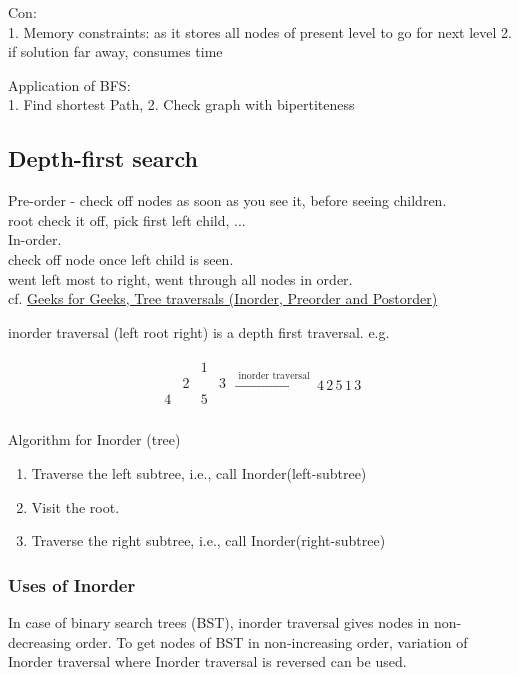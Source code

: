 \documentclass[10pt]{amsart}
\begin{document}
\begin{multicols*}{2}
Con: \\
1. Memory constraints: as it stores all nodes of present level to go for next level
2. if solution far away, consumes time

Application of BFS: \\
1. Find shortest Path,
2. Check graph with bipertiteness

\subsection{Depth-first search}

Pre-order - check off nodes as soon as you see it, before seeing children. \\
root check it off, pick first left child, ... \\

In-order. \\
check off node once left child is seen. \\
went left most to right, went through all nodes in order. \\

cf. \href{https://www.geeksforgeeks.org/tree-traversals-inorder-preorder-and-postorder/}{Geeks for Geeks, Tree traversals (Inorder, Preorder and Postorder)}

inorder traversal (left root right) is a depth first traversal. e.g.

\[
\begin{gathered}
\begin{matrix}
	& & 1 & \\
	& 2 & & 3 \\
	4 & & 5 & \\
\end{matrix} \xrightarrow{ \text{ inorder traversal } } 4 \, 2 \, 5 \, 1 \, 3
\end{gathered}
\]

Algorithm for Inorder (tree)
\begin{enumerate}
	\item Traverse the left subtree, i.e., call Inorder(left-subtree)
	\item Visit the root.
	\item Traverse the right subtree, i.e., call Inorder(right-subtree)
\end{enumerate}

\subsubsection{Uses of Inorder} In case of binary search trees (BST), inorder traversal gives nodes in non-decreasing order. To get nodes of BST in non-increasing order, variation of Inorder traversal where Inorder traversal is reversed can be used.


\end{multicols*}
\end{document}
